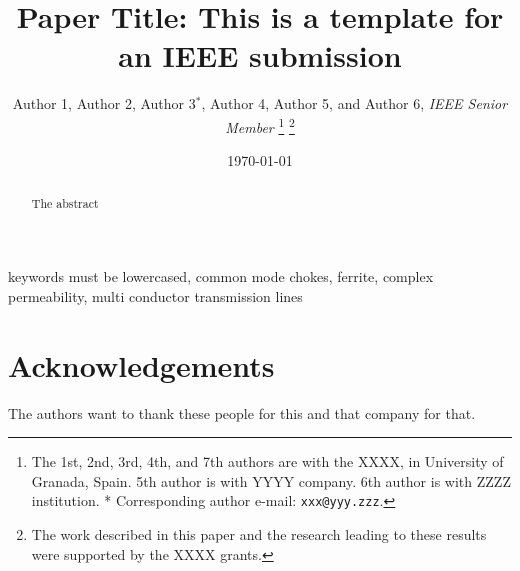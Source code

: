 \documentclass{IEEEtran}
\author{
	Author 1, Author 2, Author 3$^{*}$, \newline Author 4, Author 5, and Author 6, {\em IEEE Senior Member}
	\thanks{The 1st, 2nd, 3rd, 4th, and 7th authors are with the XXXX, in University of Granada, Spain. 
		5th author is with YYYY company.
		6th author is with ZZZZ institution. 
		* Corresponding author e-mail: \texttt{xxx@yyy.zzz}.}
	\thanks{The work described in this paper and the research leading to these results were supported by the 
		XXXX grants. 
	}
}
\date{\today}
\title{Paper Title: This is a template for an IEEE submission}
\begin{document}
	\maketitle
	
	\begin{abstract}
		The abstract
	\end{abstract}
	
	\begin{IEEEkeywords}
		keywords must be lowercased,
		common mode chokes,
		ferrite,
		complex permeability,
		multi conductor transmission lines
	\end{IEEEkeywords}
	
	
	
	
	
	\section{Acknowledgements}	
	The authors want to thank these people for this and that company for that.

	
	
	
\end{document}
